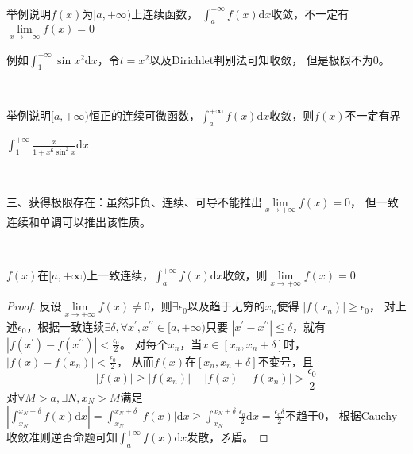 ~

\begin{exercise}
  举例说明$f(x)$为$[a,+\infty)$上连续函数，
  $\int_a^{+\infty}f(x)\mathrm{d}x$收敛，不一定有$\lim \limits _{x \rightarrow +\infty}f(x) = 0$
\end{exercise}

\begin{solution}
  例如$ \int_1^{+\infty}\sin x^2 \mathrm{d}x$，令$t = x^2$以及Dirichlet判别法可知收敛，
  但是极限不为$0$。
\end{solution}

~

\begin{exercise}
  举例说明$[a,+\infty)$恒正的连续可微函数，$\int_a^{+\infty}f(x)\mathrm{d}x$收敛，则$f(x)$不一定有界
\end{exercise}

\begin{solution}
  $\int_1^{+\infty}\frac{x}{1 + x^6\sin^2 x}\mathrm{d}x$
\end{solution}

~

\noindent 三、获得极限存在：虽然非负、连续、可导不能推出$\lim \limits _{x \rightarrow +\infty}f(x) = 0$，
但一致连续和单调可以推出该性质。

~

\begin{exercise}
  $f(x)$在$[a,+\infty)$上一致连续，$\int_a^{+\infty}f(x)\mathrm{d}x$收敛，则$\lim \limits _{x \rightarrow +\infty}f(x) = 0$
\end{exercise}

\begin{proof}
  反设$\lim \limits _{x \rightarrow +\infty}f(x) \neq 0$，则$\exists \epsilon_0$以及趋于无穷的$x_n$使得
  $|f(x_n)| \geq \epsilon_0$，
  对上述$\epsilon_0$，根据一致连续$\exists \delta,\forall x^{\prime},x^{\prime\prime} \in [a,+\infty)$只要
  $|x^{\prime} - x^{\prime\prime}| \leq \delta$，就有$|f(x^{\prime}) - f(x^{\prime\prime})| < \frac{\epsilon_0}{2}$。
  对每个$x_n$，当$x \in [x_n,x_n+\delta]$时，$|f(x) - f(x_n)| < \frac{\epsilon_0}{2}$，
  从而$f(x)$在$[x_n,x_n+\delta]$不变号，且
  \begin{equation*}
    |f(x)| \geq |f(x_n)| - |f(x) - f(x_n)| > \frac{\epsilon_0}{2}
  \end{equation*}
  对$\forall M > a, \exists N, x_N > M$满足$|\int_{x_N}^{x_N + \delta} f(x)\mathrm{d}x| = \int_{x_N}^{x_N + \delta}|f(x)|\mathrm{d}x \geq \int_{x_N}^{x_N + \delta}\frac{\epsilon_0}{2}\mathrm{d}x = \frac{\epsilon_0\delta}{2}$不趋于$0$，
  根据Cauchy收敛准则逆否命题可知$\int_a^{+\infty}f(x)\mathrm{d}x$发散，矛盾。
\end{proof}

